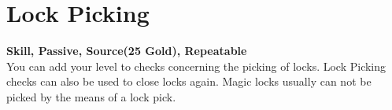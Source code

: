 \section{Lock Picking}\label{sec:lockPicking}
\textbf{Skill, Passive, Source(25 Gold), Repeatable}\\
You can add your level to checks concerning the picking of locks. Lock Picking checks can also be used to close locks again. Magic locks usually can not be picked by the means of a lock pick.